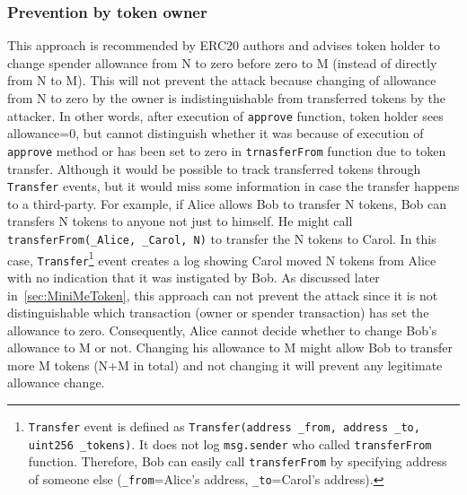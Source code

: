 \subsubsection*{Prevention by token owner} This approach is recommended by ERC20 authors \cite{Ref08} and advises token holder to change spender allowance from N to zero before zero to M (instead of directly from N to M). This will not prevent the attack because changing of allowance from N to zero by the owner is indistinguishable from transferred tokens by the attacker. In other words, after execution of \texttt{approve} function, token holder sees allowance=0, but cannot distinguish whether it was because of execution of \texttt{approve} method or has been set to zero in \texttt{trnasferFrom} function due to token transfer. Although it would be possible to track transferred tokens through \texttt{Transfer} events, but it would miss some information in case the transfer happens to a third-party. For example, if Alice allows Bob to transfer N tokens, Bob can transfers N tokens to anyone not just to himself. He might call \texttt{transferFrom(\_Alice, \_Carol, N)} to transfer the N tokens to Carol. In this case, \texttt{Transfer}\footnote{\texttt{Transfer} event is defined as \texttt{Transfer(address \_from, address \_to, uint256 \_tokens)}. It does not log \texttt{msg.sender} who called \texttt{transferFrom} function. Therefore, Bob can easily call \texttt{transferFrom} by specifying address of someone else (\texttt{\_from}=Alice's address, \texttt{\_to}=Carol's address).} event creates a log showing Carol moved N tokens from Alice with no indication that it was instigated by Bob. As discussed later in~\ref{sec:MiniMeToken}, this approach can not prevent the attack since it is not distinguishable which transaction (\ie owner or spender transaction) has set the allowance to zero. Consequently, Alice cannot decide whether to change Bob's allowance to M or not. Changing his allowance to M might allow Bob to transfer more M tokens (N+M in total) and not changing it will prevent any legitimate allowance change.

	
